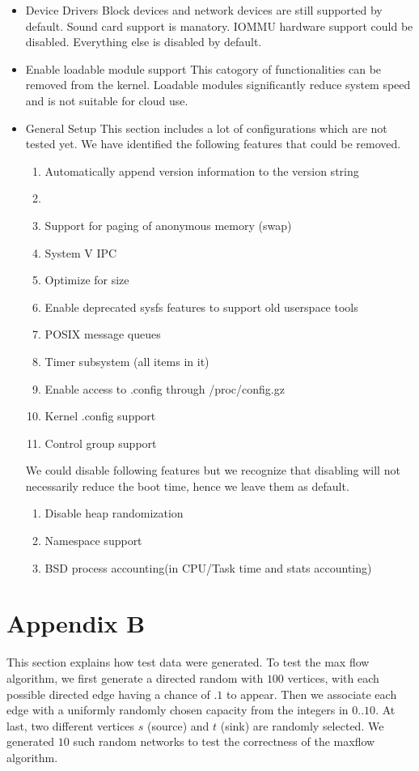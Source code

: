 \begin{itemize}
\item
Device Drivers
	Block devices and network devices are still supported by default. Sound card support is manatory. IOMMU hardware support could be disabled. Everything else is disabled by default.
\item
Enable loadable module support
	This catogory of functionalities can be removed from the kernel. Loadable modules significantly reduce system speed and is not suitable for cloud use.
\item
General Setup
	This section includes a lot of configurations which are not tested yet. We have identified the following features that could be removed.
	\begin{enumerate}
	\item
Automatically append version information to the version string
\item
\item Support for paging of anonymous memory (swap)
\item System V IPC
\item Optimize for size
\item Enable deprecated sysfs features to support old userspace tools
\item POSIX message queues
\item Timer subsystem (all items in it)
\item Enable access to .config through /proc/config.gz
\item Kernel .config support
\item Control group support
\end{enumerate}
We could disable following features but we recognize that disabling will not necessarily reduce the boot time, hence we leave them as default.
\begin{enumerate}
\item Disable heap randomization
\item Namespace support
\item BSD process accounting(in CPU/Task time and stats accounting)
\end{enumerate}
\end{itemize}


\section{Appendix B}

This section explains how test data were generated.
To test the max flow algorithm, we first generate a directed random with $100$ vertices, with each possible directed edge having a chance of $.1$ to appear.
Then we associate each edge with a uniformly randomly chosen capacity from the integers in $0..10$.
At last, two different vertices $s$ (source) and $t$ (sink) are randomly selected.
We generated $10$ such random networks to test the correctness of the maxflow algorithm.

